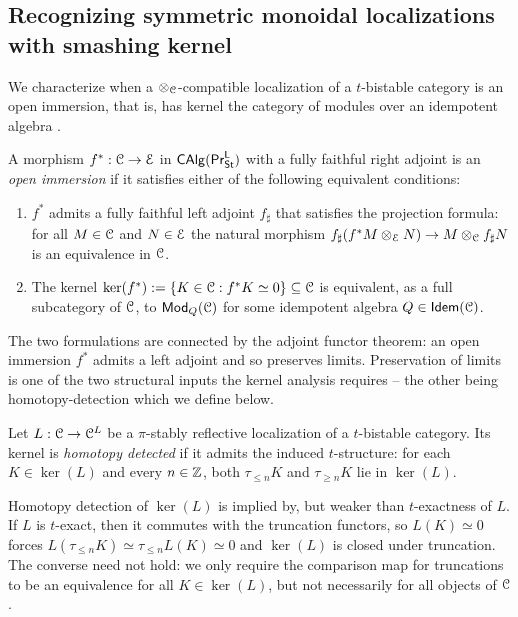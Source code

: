 \subsection{Recognizing symmetric monoidal localizations with smashing kernel}\label{subsec: detecting smashing kernel}
We characterize when a $\otimes_{\EuScript{C}}$-compatible localization of a $t$-bistable category is an open immersion, that is, has kernel the category of modules over an idempotent algebra \cite[Prop. 6.5]{Complex}.
\begin{definition}\label{def: categorical open immersion}
    A morphism $f^{*}:\EuScript{C}\to\EuScript{E}$ in $\mathsf{CAlg}(\mathsf{Pr}^{\mathsf{L}}_{\mathsf{St}})$ with a fully faithful right adjoint is an \emph{open immersion} if it satisfies either of the following equivalent conditions: 
    \begin{enumerate}[label=(\alph*)]
        \item $f^{*}$ admits a fully faithful left adjoint $f_{\sharp}$ that satisfies the projection formula: for all $M\in\EuScript{C}$ and $N\in\EuScript{E}$ the natural morphism $f_{\sharp}(f^{*}M\otimes_{\EuScript{E}}N)\to M\otimes_{\EuScript{C}}f_{\sharp}N$ is an equivalence in $\EuScript{C}$.
        \item The kernel $\ker(f^{*}):=\{K\in\EuScript{C}:f^{*}K\simeq0\}\subseteq\EuScript{C}$ is equivalent, as a full subcategory of $\EuScript{C}$, to $\mathsf{Mod}_{Q}(\EuScript{C})$ for some idempotent algebra $Q\in\mathsf{Idem}(\EuScript{C})$.
    \end{enumerate}
\end{definition}
The two formulations are connected by the adjoint functor theorem: an open immersion $f^{*}$ admits a left adjoint and so preserves limits. Preservation of limits is one of the two structural inputs the kernel analysis requires -- the other being homotopy-detection which we define below. 
\begin{definition}\label{def: kernel detected homotopy}
    Let $L:\EuScript{C}\to\EuScript{C}^{L}$ be a $\pi$-stably reflective localization of a $t$-bistable category. Its kernel is \emph{homotopy detected} if it admits the induced $t$-structure: for each $K\in\ker(L)$ and every $n\in\mathbb{Z}$, both $\tau_{\leq n}K$ and $\tau_{\geq n}K$ lie in $\ker(L)$. 
\end{definition}
\begin{remark}\label{rmk: homotopy detection of kernel}
    Homotopy detection of $\ker(L)$ is implied by, but weaker than $t$-exactness of $L$. If $L$ is $t$-exact, then it commutes with the truncation functors, so $L(K)\simeq0$ forces $L(\tau_{\leq n}K)\simeq\tau_{\leq n}L(K)\simeq0$ and $\ker(L)$ is closed under truncation. The converse need not hold: we only require the comparison map for truncations to be an equivalence for all $K\in\ker(L)$, but not necessarily for all objects of $\EuScript{C}$. 
\end{remark}
